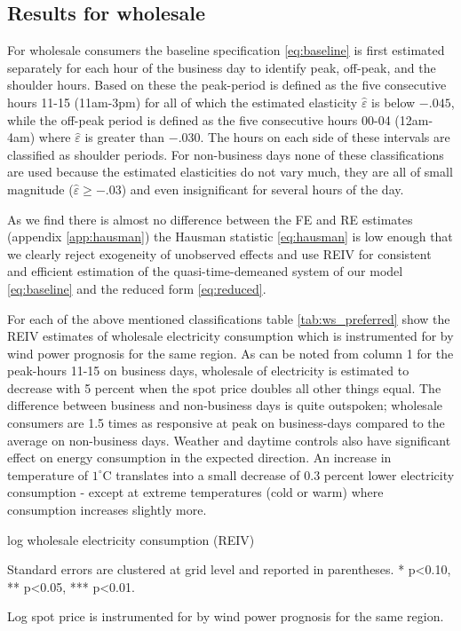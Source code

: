 \label{sec:results}
\subsection{Results for wholesale}
\label{subsec:r_wholesale}
For wholesale consumers the baseline specification \eqref{eq:baseline} is first estimated separately for each hour of the business day to identify peak, off-peak, and the shoulder hours. Based on these the peak-period is defined as the five consecutive hours 11-15 (11am-3pm) for all of which the estimated elasticity $\widehat{\varepsilon}$ is below $-.045$, while the off-peak period is defined as the five consecutive hours 00-04 (12am-4am) where $\widehat{\varepsilon}$ is greater than $-.030$. The hours on each side of these intervals are classified as shoulder periods. For non-business days none of these classifications are used because the estimated elasticities do not vary much, they are all of small magnitude ($\widehat{\varepsilon}\geq-.03$)  and even insignificant for several hours of the day.
\bigskip\par
As we find there is almost no difference between the FE and RE estimates (appendix \ref{app:hausman}) the Hausman statistic \eqref{eq:hausman} is low enough that we clearly reject exogeneity of unobserved effects and use REIV for consistent and efficient estimation of the quasi-time-demeaned system of our model \eqref{eq:baseline} and the reduced form \eqref{eq:reduced}.
\bigskip\par
For each of the above mentioned classifications table \ref{tab:ws_preferred} show the REIV estimates of wholesale electricity consumption which is instrumented for by wind power prognosis for the same region. As can be noted from column 1 for the peak-hours 11-15 on business days, wholesale of electricity is estimated to decrease with 5 percent when the spot price doubles all other things equal. The difference between business and non-business days is quite outspoken; wholesale consumers are 1.5 times as responsive at peak on business-days compared to the average on non-business days. Weather and daytime controls also have significant effect on energy consumption in the expected direction. An increase in temperature of  $1^{\circ}$C translates into a small decrease of 0.3 percent lower electricity consumption - except at extreme temperatures (cold or warm) where consumption increases slightly more.
\begin{table}[H]
\begin{threeparttable}
  \centering
  \caption{log wholesale electricity consumption (REIV)}
  \footnotesize
        
    \begin{tablenotes}
    \item Standard errors are clustered at grid level and reported in parentheses. * p<0.10, ** p<0.05, *** p<0.01.
    \item Log spot price is instrumented for by wind power prognosis for the same region.
     \end{tablenotes}
  \label{tab:ws_preferred}
\end{threeparttable}
\end{table}
\noindent

